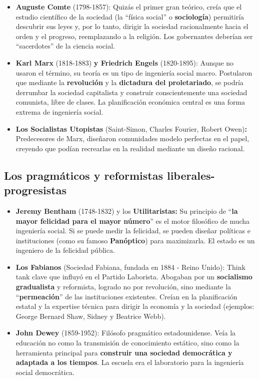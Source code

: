 \documentclass[
  letterpaper,
  DIV=11,
  numbers=noendperiod]{scrreprt}
\providecommand{\tightlist}{%
  \setlength{\itemsep}{0pt}\setlength{\parskip}{0pt}}\usepackage{longtable,booktabs,array}
\begin{document}
\begin{itemize}
\tightlist
\item
  \textbf{Auguste Comte} (1798-1857): Quizás el primer gran teórico,
  creía que el estudio científico de la sociedad (la ``física social'' o
  \textbf{sociología}) permitiría descubrir sus leyes y, por lo tanto,
  dirigir la sociedad racionalmente hacia el orden y el progreso,
  reemplazando a la religión. Los gobernantes deberían ser
  ``sacerdotes'' de la ciencia social.
\item
  \textbf{Karl Marx} (1818-1883) \textbf{y Friedrich Engels}
  (1820-1895): Aunque no usaron el término, su teoría es un tipo de
  ingeniería social macro. Postularon que mediante la
  \textbf{revolución} y la \textbf{dictadura del proletariado}, se
  podría derrumbar la sociedad capitalista y construir conscientemente
  una sociedad comunista, libre de clases. La planificación económica
  central es una forma extrema de ingeniería social.
\item
  \textbf{Los Socialistas Utopistas} (Saint-Simon, Charles Fourier,
  Robert Owen)\textbf{:} Predecesores de Marx, diseñaron comunidades
  modelo perfectas en el papel, creyendo que podían recrearlas en la
  realidad mediante un diseño racional.
\end{itemize}

\subsection{Los pragmáticos y reformistas
liberales-progresistas}\label{los-pragmuxe1ticos-y-reformistas-liberales-progresistas}

\begin{itemize}
\tightlist
\item
  \textbf{Jeremy Bentham} (1748-1832) y los \textbf{Utilitaristas:} Su
  principio de ``\textbf{la mayor felicidad para el mayor número}'' es
  el motor filosófico de mucha ingeniería social. Si se puede medir la
  felicidad, se pueden diseñar políticas e instituciones (como su famoso
  \textbf{Panóptico}) para maximizarla. El estado es un ingeniero de la
  felicidad pública.
\item
  \textbf{Los Fabianos} (Sociedad Fabiana, fundada en 1884 - Reino
  Unido): Think tank clave que influyó en el Partido Laborista. Abogaban
  por un \textbf{socialismo gradualista} y reformista, logrado no por
  revolución, sino mediante la ``\textbf{permeación}'' de las
  instituciones existentes. Creían en la planificación estatal y la
  expertise técnica para dirigir la economía y la sociedad (ejemplos:
  George Bernard Shaw, Sidney y Beatrice Webb).
\item
  \textbf{John Dewey} (1859-1952): Filósofo pragmático estadounidense.
  Veía la educación no como la transmisión de conocimiento estático,
  sino como la herramienta principal para \textbf{construir una sociedad
  democrática y adaptada a los tiempos}. La escuela era el laboratorio
  para la ingeniería social democrática.
\end{itemize}
\end{document}
